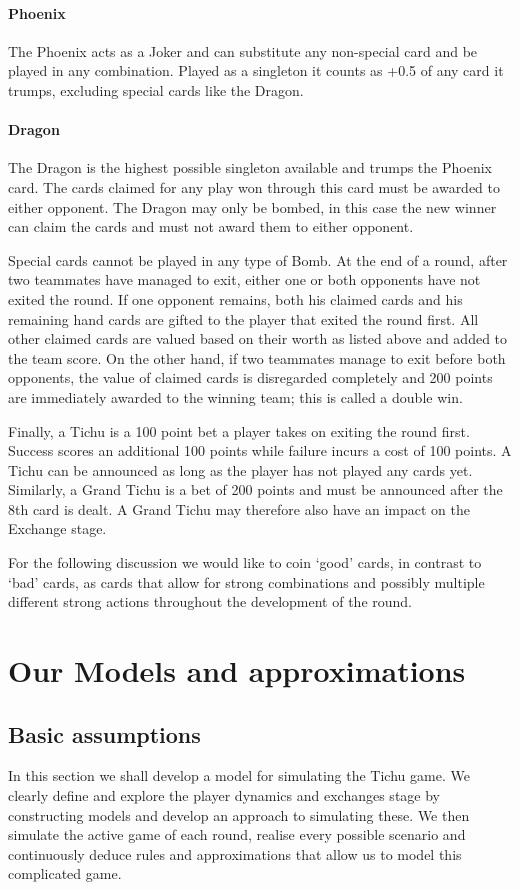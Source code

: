 \paragraph*{Phoenix}
The Phoenix acts as a Joker and can substitute any non-special card and be played in any combination. Played as a singleton it counts as +0.5 of any card it trumps, excluding special cards like the Dragon.
\paragraph{Dragon}
The Dragon is the highest possible singleton available and trumps the Phoenix card. The cards claimed for any play won through this card must be awarded to either opponent. The Dragon may only be bombed, in this case the new winner can claim the cards and must not award them to either opponent.

Special cards cannot be played in any type of Bomb. At the end of a round, after two teammates have managed to exit, either one or both opponents have not exited the round. If one opponent remains, both his claimed cards and his remaining hand cards are gifted to the player that exited the round first. All other claimed cards are valued based on their worth as listed above and added to the team score. On the other hand, if two teammates manage to exit before both opponents, the value of claimed cards is disregarded completely and 200 points are immediately awarded to the winning team; this is called a double win.

Finally, a Tichu is a 100 point bet a player takes on exiting the round first. Success scores an additional 100 points while failure incurs a cost of 100 points. A Tichu can be announced as long as the player has not played any cards yet. Similarly, a Grand Tichu is a bet of 200 points and must be announced after the 8th card is dealt. A Grand Tichu may therefore also have an impact on the Exchange stage.

For the following discussion we would like to coin ‘good’ cards, in contrast to ‘bad’ cards, as cards that allow for strong combinations and possibly multiple different strong actions throughout the development of the round.


\section{Our Models and approximations}
\subsection{Basic assumptions}
In this section we shall develop a model for simulating the Tichu game. We clearly define and explore the player dynamics and exchanges stage by constructing models and develop an approach to simulating these. We then simulate the active game of each round, realise every possible scenario and continuously deduce rules and approximations that allow us to model this complicated game.

